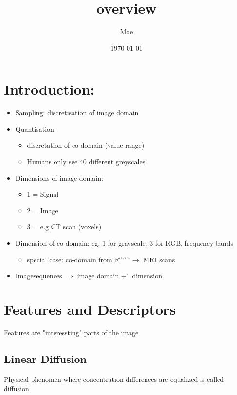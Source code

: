 \documentclass[11pt]{article}
\author{Moe}
\date{\today}
\title{overview}
\begin{document}
\maketitle
\tableofcontents


\section{Introduction:}
\label{sec-1}
\begin{itemize}
\item Sampling: discretisation of image domain
\item Quantisation: 
\begin{itemize}
\item discretation of co-domain   (value range)
\item Humans only see  40 different greyscales
\end{itemize}
\item Dimensions of image domain:
\begin{itemize}
\item 1 = Signal
\item 2 = Image
\item 3 = e.g CT scan (voxels)
\end{itemize}
\item Dimension of co-domain: eg. 1 for grayscale, 3 for RGB, frequency bands
\begin{itemize}
\item special case: co-domain from $\mathbb{R}^{n\times n} \rightarrow$  MRI scans
\end{itemize}
\item Imagesequences $\Rightarrow$ image domain +1 dimension
\end{itemize}

\section{Features and Descriptors}
\label{sec-2}
Features are "interessting" parts of the image

\subsection{Linear Diffusion}
\label{sec-2-1}
Physical phenomen where concentration differences are equalized is called diffusion
\end{document}

